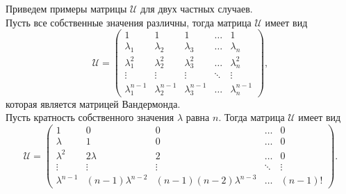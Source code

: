 Приведем примеры матрицы $\mathcal{U}$ для двух частных случаев.  \\
Пусть все собственные значения различны, тогда матрица $\mathcal{U}$ имеет вид
$$
\mathcal{U} = 
\begin{pmatrix}
	1 & 1 & 1 & \dots & 1 \\
	\lambda_1 & \lambda_2 & \lambda_3 & \dots & \lambda_n \\
	\lambda_1 ^ 2 & \lambda_2 ^2 & \lambda_3 ^2 & \dots & \lambda_n ^2 \\
	\vdots & \vdots & \vdots & \ddots & \vdots \\
	\lambda_1 ^{n-1} & \lambda_2 ^{n-1} &\lambda_3 ^{n-1} & \dots & \lambda_n ^{n-1}
\end{pmatrix},
$$
которая является матрицей Вандермонда. \\
Пусть кратность собственного значения $\lambda$ равна $n$. Тогда матрица $\mathcal{U}$ имеет вид
$$
\mathcal{U} = 
\begin{pmatrix}
	1 & 0 & 0 & \dots & 0 \\
	\lambda & 1 & 0 & \dots & 0 \\
	\lambda ^ 2 & 2 \lambda & 2 & \dots & 0 \\
	\vdots & \vdots & \vdots & \ddots & \vdots \\
	\lambda ^{n-1} & (n-1)\lambda^{n-2} & (n-1)(n-2)\lambda^{n-3} & \dots & (n-1)!
\end{pmatrix}.
$$